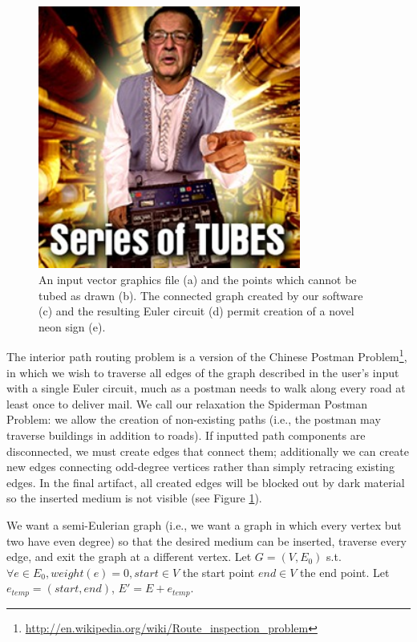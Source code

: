 \begin{figure}[h!]
\centering
    \includegraphics[width=3.4in]{figures/series-of-tubes.jpg}
\caption{An input vector graphics file (a) and the points which cannot be tubed as drawn (b).  The connected graph created by our software (c) and the resulting Euler circuit (d) permit creation of a novel neon sign (e).}
\label{fig:tool-process-interior}
\end{figure}

The interior path routing problem is a version of the Chinese Postman Problem\footnote{\url{http://en.wikipedia.org/wiki/Route_inspection_problem}}, in which we wish to traverse all edges of the graph described in the user's input with a single Euler circuit, much as a postman needs to walk along every road at least once to deliver mail.  We call our relaxation the Spiderman Postman Problem: we allow the creation of non-existing paths (i.e., the postman may traverse buildings in addition to roads).  If inputted path components are disconnected, we must create edges that connect them; additionally we can create new edges connecting odd-degree vertices rather than simply retracing existing edges.  In the final artifact, all created edges will be blocked out by dark material so the inserted medium is not visible (see Figure \ref{fig:tool-process-interior}).

We want a semi-Eulerian graph (i.e., we want a graph in which every vertex but two have even degree) so that the desired medium can be inserted, traverse every edge, and exit the graph at a different vertex.  Let $G=(V,E_0)$ s.t. $\forall e \in E_0, weight(e)=0, start \in V $ the start point $end \in V$ the end point.  Let $e_{temp} = (start, end)$, $E' = E + e_{temp}$.

